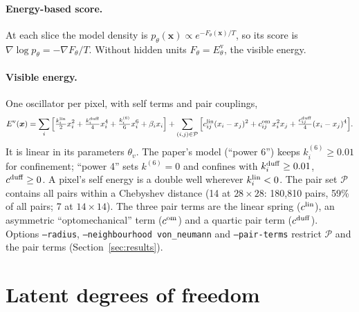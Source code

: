 \documentclass[11pt,a4paper]{article}
\newcommand{\vx}{\bm{x}}
\newcommand{\Ev}{E^{\mathrm{v}}}
\newcommand{\grad}{\nabla}
\begin{document}
\paragraph{Energy-based score.} At each slice the model density is $p_\theta(\vx)\propto e^{-F_\theta(\vx)/T}$, so
its score is $\grad\log p_\theta=-\grad F_\theta/T$. Without hidden units $F_\theta=\Ev_\theta$, the visible energy.

\paragraph{Visible energy.} One oscillator per pixel, with self terms and pair couplings,
\begin{equation}
  \Ev(\vx)=\sum_i\Big[\tfrac{k^{\rm lin}_i}{2}x_i^2+\tfrac{k^{\rm duff}_i}{4}x_i^4+\tfrac{k^{(6)}_i}{6}x_i^6+\beta_ix_i\Big]
  +\sum_{(i,j)\in\mathcal P}\Big[c^{\rm lin}_{ij}(x_i-x_j)^2+c^{\rm om}_{ij}\,x_i^2x_j+\tfrac{c^{\rm duff}_{ij}}{4}(x_i-x_j)^4\Big].
  \label{eq:Ev}
\end{equation}
It is linear in its parameters $\theta_v$. The paper's model (``power 6'') keeps $k^{(6)}_i\ge0.01$ for
confinement; ``power 4'' sets $k^{(6)}=0$ and confines with $k^{\rm duff}_i\ge0.01$, $c^{\rm duff}\ge0$. A pixel's
self energy is a double well wherever $k^{\rm lin}_i<0$. The pair set $\mathcal P$ contains all pairs within a
Chebyshev distance (14 at $28\times28$: 180{,}810 pairs, 59\% of all pairs; 7 at $14\times14$). The three pair terms
are the linear spring ($c^{\rm lin}$), an asymmetric ``optomechanical'' term ($c^{\rm om}$) and a quartic pair term
($c^{\rm duff}$). Options \texttt{--radius}, \texttt{--neighbourhood von\_neumann} and \texttt{--pair-terms} restrict
$\mathcal P$ and the pair terms (Section~\ref{sec:results}).

\section{Latent degrees of freedom}
\end{document}

